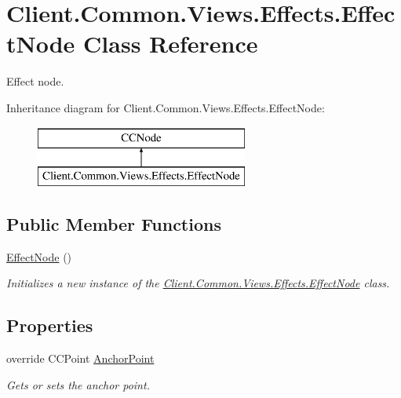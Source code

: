 \hypertarget{classClient_1_1Common_1_1Views_1_1Effects_1_1EffectNode}{}\section{Client.\+Common.\+Views.\+Effects.\+Effect\+Node Class Reference}
\label{classClient_1_1Common_1_1Views_1_1Effects_1_1EffectNode}


Effect node.  


Inheritance diagram for Client.\+Common.\+Views.\+Effects.\+Effect\+Node\+:\begin{figure}[H]
\begin{center}
\leavevmode
\includegraphics[height=2.000000cm]{classClient_1_1Common_1_1Views_1_1Effects_1_1EffectNode}
\end{center}
\end{figure}
\subsection*{Public Member Functions}
\begin{DoxyCompactItemize}
\item 
\hyperlink{classClient_1_1Common_1_1Views_1_1Effects_1_1EffectNode_a173a6b9ab0bae2fda1b9ee87a6df866c}{Effect\+Node} ()
\begin{DoxyCompactList}\small\item\em Initializes a new instance of the \hyperlink{classClient_1_1Common_1_1Views_1_1Effects_1_1EffectNode}{Client.\+Common.\+Views.\+Effects.\+Effect\+Node} class. \end{DoxyCompactList}\end{DoxyCompactItemize}
\subsection*{Properties}
\begin{DoxyCompactItemize}
\item 
override C\+C\+Point \hyperlink{classClient_1_1Common_1_1Views_1_1Effects_1_1EffectNode_ae91fac8a47756debdab73c57c834347b}{Anchor\+Point}
\begin{DoxyCompactList}\small\item\em Gets or sets the anchor point. \end{DoxyCompactList}\end{DoxyCompactItemize}



